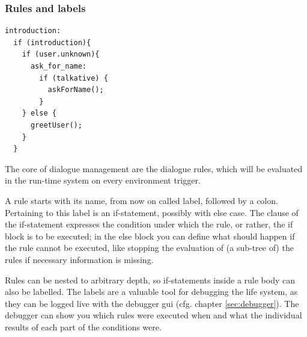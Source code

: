 \subsubsection{Rules and labels}

\begin{small}
\begin{verbatim}
introduction:
  if (introduction){
    if (user.unknown){
      ask_for_name:
        if (talkative) {
          askForName();
        }
    } else {
      greetUser();
    }
  }
\end{verbatim}
\end{small}

%
The core of \vonda dialogue management are the dialogue rules, which will be evaluated in the run-time system on every environment trigger.

A rule starts with its name, from now on called label, followed by a colon. Pertaining to this label is an if-statement, possibly with else case. The clause of the if-statement expresses the condition under which the rule, or rather, the if block is to be executed; in the else block you can define what should happen if the rule cannot be executed, like stopping the evaluation of (a sub-tree of) the rules if necessary information is missing.

%
Rules can be nested to arbitrary depth, so if-statements inside a rule body can also be labelled. The labels are a valuable tool for debugging the life system, as they can be logged live with the debugger gui (cfg. chapter \ref{sec:debugger}). The debugger can show you which rules were executed when and what the individual results of each part of the conditions were.


